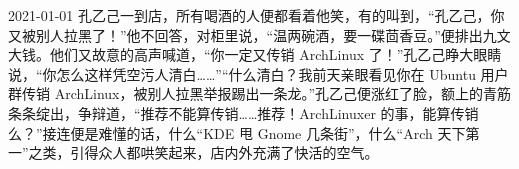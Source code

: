 \begin{diary}{2021-01-01}
    孔乙己一到店，所有喝酒的人便都看着他笑，有的叫到，“孔乙己，你又被别人拉黑了！”他不回答，对柜里说，“温两碗酒，要一碟茴香豆。”便排出九文大钱。他们又故意的高声喊道，“你一定又传销 ArchLinux 了！”孔乙己睁大眼睛说，“你怎么这样凭空污人清白……”“什么清白？我前天亲眼看见你在 Ubuntu 用户群传销 ArchLinux，被别人拉黑举报踢出一条龙。”孔乙己便涨红了脸，额上的青筋条条绽出，争辩道，“推荐不能算传销……推荐！ArchLinuxer 的事，能算传销么？”接连便是难懂的话，什么“KDE 甩 Gnome 几条街”，什么“Arch 天下第一”之类，引得众人都哄笑起来，店内外充满了快活的空气。
\end{diary}
